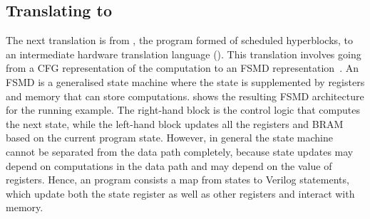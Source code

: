 

\subsection{Translating \rtlpar{} to \htl{}}\label{sec:itv:rtlpar-to-htl}

The next translation is from \rtlpar{}, the program formed of scheduled
hyperblocks, to an intermediate hardware translation language (\htl{}).  This
translation involves going from a \gls{CFG} representation of the computation to
an \gls{FSMD} representation~\cite{hwang99_ffplp}. An \gls{FSMD} is a
generalised state machine where the state is supplemented by registers and
memory that can store computations.   shows the
resulting \gls{FSMD} architecture for the running example. The right-hand block
is the control logic that computes the next state, while the left-hand block
updates all the registers and \gls{BRAM} based on the current program state.
However, in general the state machine cannot be separated from the data path
completely, because state updates may depend on computations in the data path
and may depend on the value of registers.  Hence, an \htl{} program consists a
map from states to Verilog statements, which update both the state register as
well as other registers and interact with memory.

